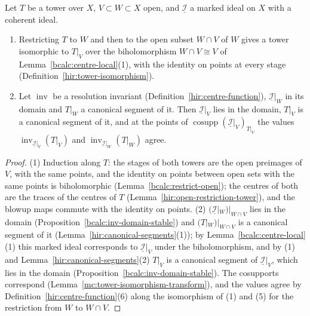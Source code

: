 \begin{lemma}
\label{bcalc:restrict-nested}
\leanok
Let \(T\) be a tower over \(X\), \(V\subset W\subset X\) open, and \(\underline{\mathcal I}\) a marked ideal on \(X\) with a coherent ideal.
\begin{enumerate}
\item Restricting \(T\) to \(W\) and then to the open subset \(W\cap V\) of \(W\) gives a tower isomorphic to \(T|_V\) over the biholomorphism \(W\cap V\cong V\) of
Lemma~\ref{bcalc:centre-local}(1), with the identity on points at every stage (Definition~\ref{hir:tower-isomorphism}).
\item Let \(\operatorname{inv}\) be a resolution invariant (Definition~\ref{hir:centre-function}), \(\underline{\mathcal I}|_W\) in its domain and \(T|_W\) a canonical segment of
it. Then \(\underline{\mathcal I}|_V\) lies in the domain, \(T|_V\) is a canonical segment of it, and at the points of
\(\operatorname{cosupp}(\underline{\mathcal I}|_V)_{T|_V}\) the values \(\operatorname{inv}_{\underline{\mathcal I}|_V}(T|_V)\) and
\(\operatorname{inv}_{\underline{\mathcal I}|_W}(T|_W)\) agree.
\end{enumerate}
\end{lemma}
\begin{proof}
\leanok
(1) Induction along \(T\): the stages of both towers are the open preimages of \(V\), with the same points, and the identity on points between open
sets with the same points is biholomorphic (Lemma~\ref{bcalc:restrict-open}); the centres of both are the traces of the centres of \(T\)
(Lemma~\ref{hir:open-restriction-tower}), and the blowup maps commute with the identity on points. (2) \((\underline{\mathcal I}|_W)|_{W\cap V}\) lies in the domain
(Proposition~\ref{bcalc:inv-domain-stable}) and \((T|_W)|_{W\cap V}\) is a canonical segment of it (Lemma~\ref{hir:canonical-segments}(1)); by
Lemma~\ref{bcalc:centre-local}(1) this marked ideal corresponds to \(\underline{\mathcal I}|_V\) under the biholomorphism, and by (1) and
Lemma~\ref{hir:canonical-segments}(2) \(T|_V\) is a canonical segment of \(\underline{\mathcal I}|_V\), which lies in the domain (Proposition~\ref{bcalc:inv-domain-stable}).
The cosupports correspond (Lemma~\ref{mc:tower-isomorphism-transform}), and the values agree by Definition~\ref{hir:centre-function}(6) along the isomorphism of (1)
and (5) for the restriction from \(W\) to \(W\cap V\).
\end{proof}

